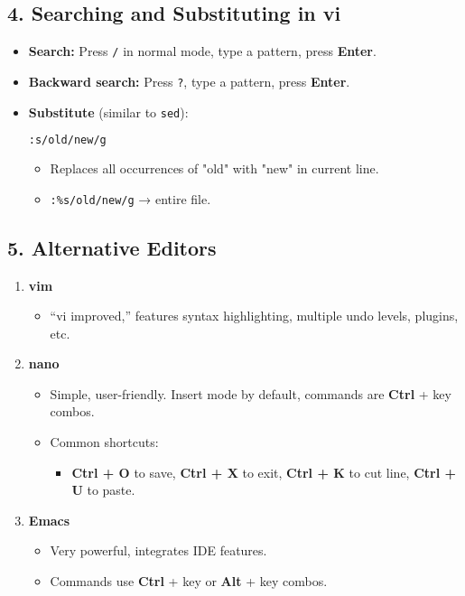 \documentclass[a4paper]{report}
\begin{document}
\subsection*{4. Searching and Substituting in vi}
\begin{itemize}
    \item \textbf{Search:} Press \texttt{/} in normal mode, type a pattern, press \textbf{Enter}.
    \item \textbf{Backward search:} Press \texttt{?}, type a pattern, press \textbf{Enter}.
    \item \textbf{Substitute} (similar to \texttt{sed}):
\begin{lstlisting}[language=bash]
:s/old/new/g
\end{lstlisting}
    \begin{itemize}
        \item Replaces all occurrences of "old" with "new" in current line.
        \item \texttt{:\%s/old/new/g} → entire file.
    \end{itemize}
\end{itemize}


\subsection*{5. Alternative Editors}
\begin{enumerate}
    \item \textbf{vim}
    \begin{itemize}
        \item “vi improved,” features syntax highlighting, multiple undo levels, plugins, etc.
    \end{itemize}

    \item \textbf{nano}
    \begin{itemize}
        \item Simple, user-friendly. Insert mode by default, commands are \textbf{Ctrl} + key combos.
        \item Common shortcuts:
        \begin{itemize}
            \item \textbf{Ctrl + O} to save, \textbf{Ctrl + X} to exit, \textbf{Ctrl + K} to cut line, \textbf{Ctrl + U} to paste.
        \end{itemize}
    \end{itemize}

    \item \textbf{Emacs}
    \begin{itemize}
        \item Very powerful, integrates IDE features.
        \item Commands use \textbf{Ctrl} + key or \textbf{Alt} + key combos.
    \end{itemize}
\end{enumerate}
\end{document}
